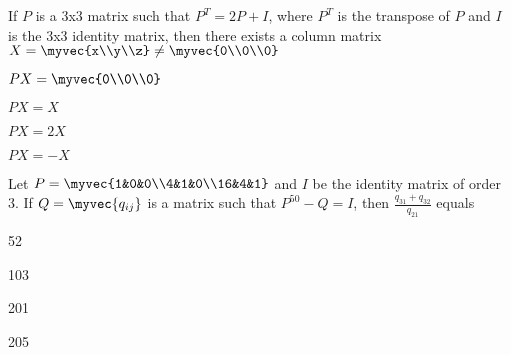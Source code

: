             \item If $P$ is a 3x3 matrix such that $P^T = 2P +I$, where $P^T$ is the transpose of $P$ and $I$ is the 3x3 identity matrix, then there exists a column matrix $X=\myvec{x\\y\\z} \neq \myvec{0\\0\\0}$
                \hfill{}
                \begin{enumerate}

                        \begin{multicols}{2}
                        \item $PX=\myvec{0\\0\\0}$ \columnbreak
                        \item $PX=X$
                        \end{multicols}
                        \begin{multicols}{2}
                        \item $PX=2X$ \columnbreak
                        \item $PX = -X$
                        \end{multicols}
                \end{enumerate}

            \item Let $P=\myvec{1&0&0\\4&1&0\\16&4&1}$ and $I$ be the identity matrix of order 3. If $Q = \myvec{q_{ij}}$ is a matrix such that $P^{50} -Q =I$, then $\frac{q_{31}+q_{32}}{q_{21}}$ equals
                \hfill{}
                \begin{enumerate}

                        \begin{multicols}{4}
                        \item52 \columnbreak
                        \item103 \columnbreak
                        \item201 \columnbreak
                        \item205 
                        \end{multicols}
                \end{enumerate}

